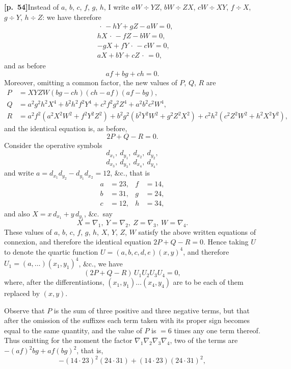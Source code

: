 \documentclass[11pt,a4paper]{article}
\begin{document}
\noindent\textbf{[p.~54]}\quad Instead of $a$, $b$, $c$, $f$, $g$, $h$, I write $a W \div YZ$, $b W \div ZX$, $c W \div XY$, $f \div X$, $g \div Y$, $h \div Z$: we have therefore
\begin{align*}
&\,\cdot\, - hY + gZ - aW = 0, \\
& hX\,\cdot\, - fZ - bW = 0, \\
& -gX + fY\,\cdot\, - cW = 0, \\
& aX + bY + cZ\,\cdot\, = 0,
\end{align*}
and as before
\[
af + bg + ch = 0.
\]
Moreover, omitting a common factor, the new values of $P$, $Q$, $R$ are
\begin{align*}
P &= XYZW(bg - ch)(ch - af)(af - bg), \\
Q &= a^{2}g^{2}h^{2}X^{4} + b^{2}h^{2}f^{2}Y^{4} + c^{2}f^{2}g^{2}Z^{4} + a^{2}b^{2}c^{2}W^{4}, \\
R &= a^{2}f^{2}(a^{2}X^{2}W^{2} + f^{2}Y^{2}Z^{2}) + b^{2}g^{2}(b^{2}Y^{2}W^{2} + g^{2}Z^{2}X^{2}) + c^{2}h^{2}(c^{2}Z^{2}W^{2} + h^{2}X^{2}Y^{2}),
\end{align*}
and the identical equation is, as before,
\[
2P + Q - R = 0.
\]
Consider the operative symbols
\[
d_{x_{1}},\ d_{y_{1}},\ d_{x_{2}},\ d_{y_{2}},
\]
\[
d_{x_{3}},\ d_{y_{3}},\ d_{x_{4}},\ d_{y_{4}},
\]
and write $a = d_{x_{1}}d_{y_{2}} - d_{y_{1}}d_{x_{2}} = 12$, \&c., that is
\begin{align*}
a &= 23, & f &= 14, \\
b &= 31, & g &= 24, \\
c &= 12, & h &= 34,
\end{align*}
and also $X = x\,d_{x_{1}} + y\,d_{y_{1}}$, \&c.\ say
\[
X = \nabla_{1},\ Y = \nabla_{2},\ Z = \nabla_{3},\ W = \nabla_{4}.
\]
These values of $a$, $b$, $c$, $f$, $g$, $h$, $X$, $Y$, $Z$, $W$ satisfy the above written equations of connexion, and therefore the identical equation $2P + Q - R = 0$. Hence taking $U$ to denote the quartic function $U = (a, b, c, d, e)(x, y)^{4}$, and therefore $U_{1} = (a, \ldots)(x_{1}, y_{1})^{4}$, \&c., we have
\[
(2P + Q - R)\,U_{1}U_{2}U_{3}U_{4} = 0,
\]
where, after the differentiations, $(x_{1}, y_{1}) \ldots (x_{4}, y_{4})$ are to be each of them replaced by $(x, y)$.

Observe that $P$ is the sum of three positive and three negative terms, but that after the omission of the suffixes each term taken with its proper sign becomes equal to the same quantity, and the value of $P$ is $=6$ times any one term thereof. Thus omitting for the moment the factor $\nabla_{1}\nabla_{2}\nabla_{3}\nabla_{4}$, two of the terms are $-(af)^{2}bg + af(bg)^{2}$, that is,
\[
-(14\cdot 23)^{2}(24\cdot 31) + (14\cdot 23)(24\cdot 31)^{2},
\]
\end{document}
